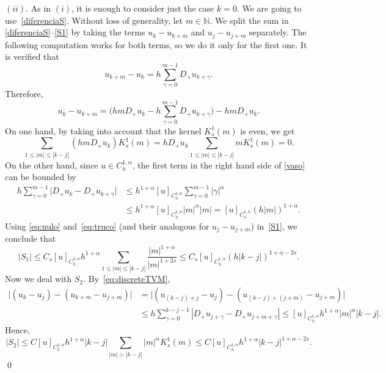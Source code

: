 \documentclass[a4paper,11pt,reqno]{amsart}
\newcommand{\N}{\mathbb{N}}
\theoremstyle{definition}
\numberwithin{equation}{section}
\begin{document}
\noindent$(ii)$. As in $(i)$, it is enough to consider just the case $k=0$.
We are going to use~\eqref{diferenciaS}.
Without loss of generality, let $m\in \N$. We split the sum in \eqref{diferenciaS}--\eqref{S1}
by taking the terms $u_{k}-u_{k+m}$ and $u_j-u_{j+m}$ separately.
The following computation works for both terms, so we do it only for the first one. It is verified that
\begin{equation}
\label{eq:discreteTVM}
u_{k+m}-u_{k}=h\sum_{\gamma=0}^{m-1}D_+u_{k+\gamma}.
\end{equation}
Therefore,
\begin{equation}
\label{vaso}
u_{k}-u_{k+m}=\Big(hmD_{+}u_{k}-
h\sum_{\gamma=0}^{m-1}D_+u_{k+\gamma}\Big)
-hmD_{+}u_{k}.
\end{equation}
On one hand, by taking into account that the kernel $K^1_s(m)$ is even, we get
\begin{equation}
\label{eq:nulo}
\sum_{1\leq|m|\le|k-j|}(hm D_{+}u_{k})K^1_s(m)
=hD_{+}u_{k}\sum_{1\leq|m|\le|k-j|}mK^1_s(m)=0.
\end{equation}
On the other hand, since $u\in C_h^{1,\alpha}$,
the first term in the right hand side of \eqref{vaso} can be bounded by
\begin{equation}
\label{eq:truco}
\begin{aligned}
h\sum_{\gamma=0}^{m-1}\big|D_{+}u_{k}-D_{+}u_{k+\gamma}\big| &\le h^{1+\alpha}[u]_{C^{1,\alpha}_h}
\sum_{\gamma=0}^{m-1}|\gamma|^{\alpha} \\
&\le h^{1+\alpha}[u]_{C^{1,\alpha}_h}|m|^{\alpha}|m|
=[u]_{C^{1,\alpha}_h}(h|m|)^{1+\alpha}.
\end{aligned}
\end{equation}
Using \eqref{eq:nulo} and~\eqref{eq:truco} (and their analogous for $u_{j}-u_{j+m}$)
in~\eqref{S1}, we conclude that
\[
|S_1|\le C_{s}[u]_{C^{1,\alpha}_h}h^{1+\alpha}\sum_{1\leq|m|\le|k-j|}
\frac{|m|^{1+\alpha}}{|m|^{1+2s}}
\le C_{s}[u]_{C^{1,\alpha}_h}(h|k-j|)^{1+\alpha-2s}.
\]
Now we deal with $S_2$. By~\eqref{eq:discreteTVM},
\begin{align*}
\big|(u_{k}-u_{j})-(u_{k+m}-u_{j+m})\big|&=\big|(u_{(k-j)+j}-u_{j})-(u_{(k-j)+(j+m)}-u_{j+m})\big|\\
&\le h\sum_{\gamma=0}^{k-j-1}|D_{+}u_{j+\gamma}-D_{+}u_{j+m+\gamma}|\le [u]_{C^{1,\alpha}_h}h^{1+\alpha}|m
|^{\alpha}|k-j|.
\end{align*}
Hence,
\[
|S_2| \le C[u]_{C^{1,\alpha}_h}h^{1+\alpha}|k-j| \sum_{|m|>|k-j|}|m|^{\alpha}
K^1_s(m)\le C[u]_{C^{1,\alpha}_h}h^{1+\alpha}|k-j|^{1+\alpha-2s}.
\]
\qed
\end{document}
